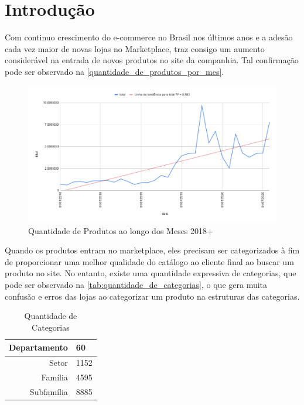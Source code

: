 \chapter[Introdução]{Introdução}

Com continuo crescimento do e-commerce no Brasil nos últimos anos e a adesão cada vez maior de novas lojas no Marketplace, traz consigo um aumento considerável na entrada de novos produtos no site da companhia. Tal confirmação pode ser observado na \autoref{quantidade_de_produtos_por_mes}.

\begin{figure}[htb]
	\caption{\label{quantidade_de_produtos_por_mes} Quantidade de Produtos ao longo dos Meses 2018+}
	\begin{center}
	    \includegraphics[width=\textwidth]{artigo/recursos/imagens/Quantidade de Produtos ao longo dos Meses 2018+.png}
	\end{center}
\end{figure}

Quando os produtos entram no marketplace, eles precisam ser categorizados à fim de proporcionar uma melhor qualidade do catálogo ao cliente final ao buscar um produto no site. No entanto, existe uma quantidade expressiva de categorias, que pode ser observado na \autoref{tab:quantidade_de_categorias}, o que gera muita confusão e erros das lojas ao  categorizar um produto na estruturas das categorias.

\begin{table}[]
    \centering
    \caption{Quantidade de Categorias}
    \begin{tabular}{r|l} \hline
        Departamento & 60  \\ \hline
        Setor & 1152 \\ \hline
        Família & 4595 \\ \hline
        Subfamília & 8885 \\ \hline
    \end{tabular}
    \label{tab:quantidade_de_categorias}
\end{table}

